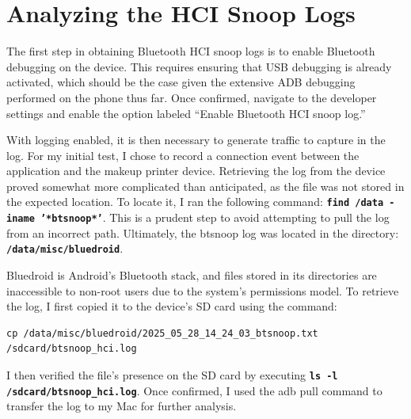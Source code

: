 \section{Analyzing the HCI Snoop Logs}
The first step in obtaining Bluetooth HCI snoop logs is to enable Bluetooth debugging on the device. This requires ensuring that USB debugging is already activated, which should be the case given the extensive ADB debugging performed on the phone thus far. Once confirmed, navigate to the developer settings and enable the option labeled “Enable Bluetooth HCI snoop log.”

With logging enabled, it is then necessary to generate traffic to capture in the log. For my initial test, I chose to record a connection event between the application and the makeup printer device. Retrieving the log from the device proved somewhat more complicated than anticipated, as the file was not stored in the expected location. To locate it, I ran the following command: \textbf{\texttt{find /data -iname '*btsnoop*'}}. This is a prudent step to avoid attempting to pull the log from an incorrect path. Ultimately, the btsnoop log was located in the directory: \textbf{\texttt{/data/misc/bluedroid}}.

Bluedroid is Android’s Bluetooth stack, and files stored in its directories are inaccessible to non-root users due to the system’s permissions model. To retrieve the log, I first copied it to the device’s SD card using the command: \begin{verbatim}
cp /data/misc/bluedroid/2025_05_28_14_24_03_btsnoop.txt /sdcard/btsnoop_hci.log
\end{verbatim}
I then verified the file’s presence on the SD card by executing \textbf{\texttt{ls -l /sdcard/btsnoop\_hci.log}}. Once confirmed, I used the adb pull command to transfer the log to my Mac for further analysis.

